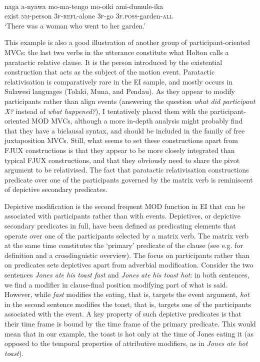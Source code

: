 \ea \label{Tobelo_29}
\\
\gll naga a-nyawa mo-ma-tengo mo-oiki ami-dumule-ika \\
exist \textsc{nm}-person 3\textsc{f}-\textsc{refl}-alone 3\textsc{f}-go 3\textsc{f}.\textsc{poss}-garden-\textsc{all} \\
\glft `There was a woman who went to her garden.'\\ 
\z

This example is also a good illustration of another group of participant-oriented MVCs: the last two verbs in the utterance constitute what Holton calls a paratactic relative clause. It is the person introduced by the existential construction that acts as the subject of the motion event. Paratactic relativisation is comparatively rare in the EI sample, and mostly occurs in Sulawesi languages (Tolaki, Muna, and Pendau). As they appear to modify participants rather than align events (answering the question \textit{what did participant X?} instead of \textit{what happened?}), I tentatively placed them with the participant-oriented MOD MVCs, although a more in-depth analysis might probably find that they have a biclausal syntax, and should be included in the family of free juxtaposition MVCs. Still, what seems to set these constructions apart from FJUX constructions is that they appear to be more closely integrated than typical FJUX constructions, and that they obviously need to share the pivot argument to be relativised. The fact that paratactic relativisation constructions predicate over one of the participants governed by the matrix verb is reminiscent of depictive secondary predicates.

Depictive modification is the second frequent MOD function in EI that can be associated with participants rather than with events. Depictives, or depictive secondary predicates in full, have been defined as predicating elements that operate over one of the participants selected by a matrix verb. The matrix verb at the same time constitutes the `primary' predicate of the clause (see e.g. \citealt{schultze2004depictive} for definition and a crosslinguistic overview). The focus on participants rather than on predicates sets depictives apart from adverbial modification. Consider the two sentences \textit{Jones ate his toast fast} and \textit{Jones ate his toast hot}: in both sentences, we find a modifier in clause-final position modifying part of what is said. However, while \textit{fast} modifies the eating, that is, targets the event argument, \textit{hot} in the second sentence modifies the toast, that is, targets one of the participants associated with the event. A key property of such depictive predicates is that their time frame is bound by the time frame of the primary predicate. This would mean that in our example, the toast is hot only at the time of Jones eating it (as opposed to the temporal properties of attributive modifiers, as in \textit{Jones ate hot toast}).

